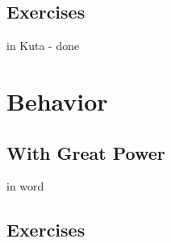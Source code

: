 \subsection{Exercises}
in Kuta - done



\newpage
\section{Behavior}
\subsection{With Great Power}
in word 
\newpage

\newpage
\subsection{Exercises}
\noindent{}
